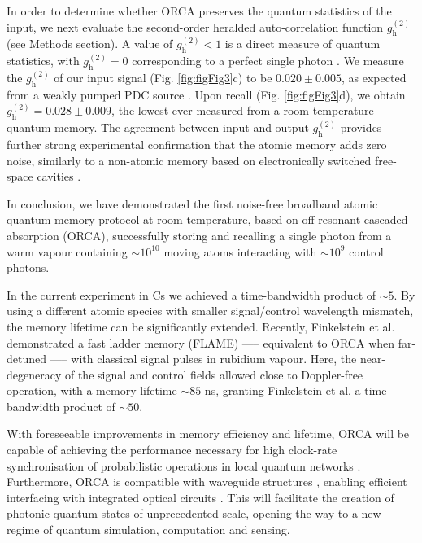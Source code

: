 \documentclass[12pt]{iopart}
\begin{document}
In order to determine whether ORCA preserves the quantum statistics of the input, we next evaluate the second-order heralded auto-correlation function $g^{(2)}_\mathrm{h}$ (see Methods section). A value of $g^{(2)}_\mathrm{h}<1$ is a direct measure of quantum statistics, with $g^{(2)}_\mathrm{h}=0$ corresponding to a perfect single photon \cite{Zhou2012}. We measure the $g_\mathrm{h}^{(2)}$ of our input signal (Fig. \ref{fig:figFig3}c) to be $0.020\pm0.005$, as expected from a weakly pumped PDC source \cite{Michelberger2015}. Upon recall (Fig. \ref{fig:figFig3}d), we obtain $g_\mathrm{h}^{(2)}=0.028\pm0.009$, the lowest ever measured from a room-temperature quantum memory. The agreement between input and output $g_\mathrm{h}^{(2)}$ provides further strong experimental confirmation that the atomic memory adds zero noise, similarly to a non-atomic memory based on electronically switched free-space cavities \cite{Kaneda2015}.

In conclusion, we have demonstrated the first noise-free broadband atomic quantum memory protocol at room temperature, based on off-resonant cascaded absorption (ORCA), successfully storing and recalling a single photon from a warm vapour containing $\sim10^{10}$ moving atoms interacting with $\sim10^{9}$ control photons.

In the current experiment in Cs we achieved a time-bandwidth product of $\sim5$. By using a different atomic species with smaller signal/control wavelength mismatch, the memory lifetime can be significantly extended. Recently, Finkelstein et al. \cite{Finkelstein2017} demonstrated a fast ladder memory (FLAME) —-- equivalent to ORCA when far-detuned —-- with classical signal pulses in rubidium vapour. Here, the near-degeneracy of the signal and control fields allowed close to Doppler-free operation, with a memory lifetime $\sim85$ ns, granting Finkelstein et al. a time-bandwidth product of $\sim50$.

With foreseeable improvements in memory efficiency and lifetime, ORCA will be capable of achieving the performance necessary for high clock-rate synchronisation of probabilistic operations in local quantum networks \cite{Nunn2013}. Furthermore, ORCA is compatible with waveguide structures \cite{Sprague2014,Kaczmarek2015}, enabling efficient interfacing with integrated optical circuits \cite{Harris2017}. This will facilitate the creation of photonic quantum states of unprecedented scale, opening the way to a new regime of quantum simulation, computation and sensing.
\end{document}

